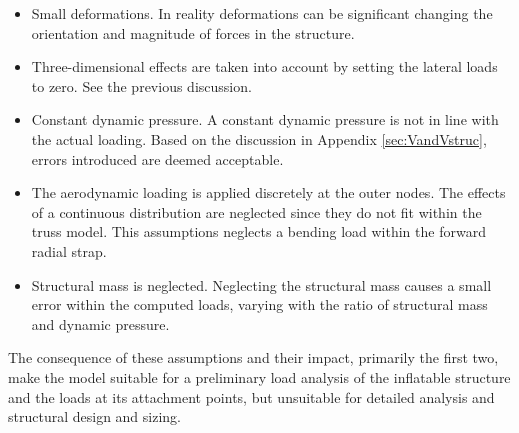 \begin{itemize}
\item Small deformations. In reality deformations can be significant changing the orientation and magnitude of forces in the structure.
\item Three-dimensional effects are taken into account by setting the lateral loads to zero. See the previous discussion.
\item Constant dynamic pressure. A constant dynamic pressure is not in line with the actual loading. Based on the discussion in Appendix \ref{sec:VandVstruc}, errors introduced are deemed acceptable.
\item The aerodynamic loading is applied discretely at the outer nodes. The effects of a continuous distribution are neglected since they do not fit within the truss model. This assumptions neglects a bending load within the forward radial strap. 
\item Structural mass is neglected. Neglecting the structural mass causes a small error within the computed loads, varying with the ratio of structural mass and dynamic pressure.
\end{itemize} 
The consequence of these assumptions and their impact, primarily the first two, make the model suitable for a preliminary load analysis of the inflatable structure and the loads at its attachment points, but unsuitable for detailed analysis and structural design and sizing. %





